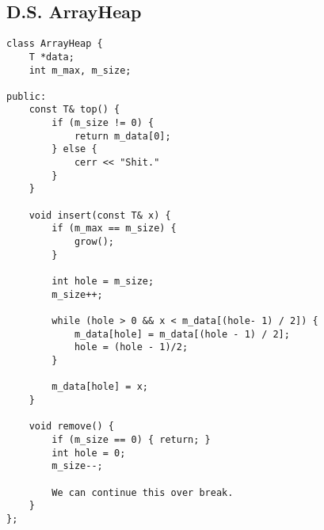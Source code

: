 \documentclass{article}
\begin{document}
\subsection*{D.S. ArrayHeap}
\begin{verbatim}
class ArrayHeap {
    T *data;
    int m_max, m_size;

public:
    const T& top() {
        if (m_size != 0) {
            return m_data[0];
        } else {
            cerr << "Shit."
        }
    }

    void insert(const T& x) {
        if (m_max == m_size) {
            grow();
        }

        int hole = m_size;
        m_size++;

        while (hole > 0 && x < m_data[(hole- 1) / 2]) {
            m_data[hole] = m_data[(hole - 1) / 2];
            hole = (hole - 1)/2;
        }

        m_data[hole] = x;
    }

    void remove() {
        if (m_size == 0) { return; }
        int hole = 0;
        m_size--;

        We can continue this over break.
    }
};
\end{verbatim}
\end{document}
